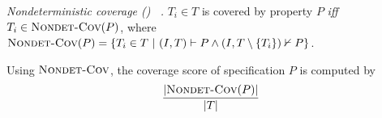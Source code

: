 \begin{definition} {\emph{Nondeterministic coverage (\nondetcov) ~\cite{chockler2010coverage}.} }
\label{def:non-det}
$T_i \in T$ is covered by property $P$ \emph{iff} $T_i \in \text{\sc Nondet-Cov} (P)$, where
$\text{\sc Nondet-Cov} (P) = \{T_i \in T~|~ (I, T) \vdash P \wedge (I, T \setminus \{T_i\}) \nvdash P\}$.
\end{definition}

Using  $\text{\sc Nondet-Cov}$, the coverage score of specification $P$ is computed by
\[
   \frac{ | \text{\sc Nondet-Cov} (P)|}{|T|}
\]



